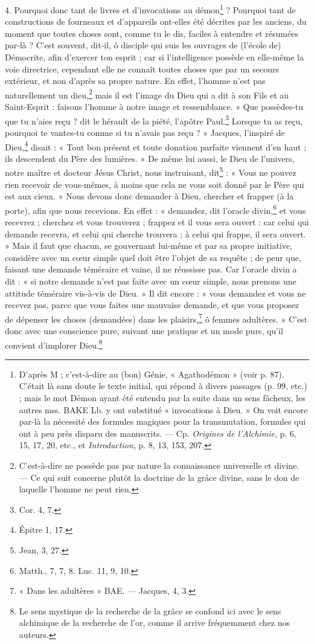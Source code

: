 \documentclass[a4paper, 11pt, oneside, polutonikogreek, french]{article}
\begin{document}
4. Pourquoi donc tant de livres et d'invocations au démon\footnote{D'après M ; c'est-à-dire au (bon) Génie, « Agathodémon » (voir p. 87). C'était là sans doute le texte initial, qui répond à divers passages (p. 99, etc.) ; mais le mot Démon ayant été entendu par la suite dans un sens fâcheux, les autres mss. BAKE Lb. y ont substitué « invocations à Dieu. » On voit encore par-là la nécessité des formules magiques pour la transmutation, formules qui ont à peu près disparu des manuscrits. --- Cp. \emph{Origines de l'Alchimie}, p. 6, 15, 17, 20, etc., et \emph{Introduction}, p. 8, 13, 153, 207.} ? Pourquoi tant de constructions de fourneaux et d'appareils ont-elles été décrites par les anciens, du moment que toutes choses sont, comme tu le dis, faciles à entendre et résumées par-là ? C'est souvent, dit-il, ô disciple qui suis les ouvrages de (l'école de) Démocrite, afin d'exercer ton esprit ; car si l'intelligence possède en elle-même la voie directrice, cependant elle ne connaît toutes choses que par un secours extérieur, et non d'après sa propre nature. En effet, l'homme n'est pas naturellement un dieu,\footnote{C'est-à-dire ne possède pas par nature la connaissance universelle et divine. --- Ce qui suit concerne plutôt la doctrine de la grâce divine, sans le don de laquelle l'homme ne peut rien.} mais il est l'image du Dieu qui a dit à son Fils et au Saint-Esprit : faisons l'homme à notre image et ressemblance. « Que possèdes-tu que tu n'aies reçu ? dit le hérault de la piété, l'apôtre Paul.\footnote{Cor. 4, 7.} Lorsque tu as reçu, pourquoi te vantes-tu comme si tu n'avais pas reçu ? » Jacques, l'inspiré de Dieu,\footnote{Épitre 1, 17.} disait : « Tout bon présent et toute donation parfaite viennent d'en haut ; ils descendent du Père des lumières. » De même lui aussi, le Dieu de l'univers, notre maître et docteur Jésus Christ, nous instruisant, dit\footnote{Jean, 3, 27.} : « Vous ne pouvez rien recevoir de vous-mêmes, à moins que cela ne vous soit donné par le Père qui est aux cieux. » Nous devons donc demander à Dieu, chercher et frapper (à la porte), afin que nous recevions. En effet : « demandez, dit l'oracle divin,\footnote{Matth., 7, 7, 8. Luc. 11, 9, 10.} et vous recevrez ; cherchez et vous trouverez ; frappez et il vous sera ouvert : car celui qui demande recevra, et celui qui cherche trouvera ; à celui qui frappe, il sera ouvert. » Mais il faut que chacun, se gouvernant lui-même et par sa propre initiative, considère avec un cœur simple quel doit être l'objet de sa requête ; de peur que, faisant une demande téméraire et vaine, il ne réussisse pas. Car l'oracle divin a dit : « si notre demande n'est pas faite avec un cœur simple, nous prenons une attitude téméraire vis-à-vis de Dieu. » Il dit encore : « vous demandez et vous ne recevez pas, parce que vous faites une mauvaise demande, et que vous proposez de dépenser les choses (demandées) dans les plaisirs,\footnote{« Dans les adultères » BAE. --- Jacques, 4, 3.} ô femmes adultères. » C'est donc avec une conscience pure, suivant une pratique et un mode purs, qu'il convient d'implorer Dieu.\footnote{Le sens mystique de la recherche de la grâce se confond ici avec le sens alchimique de la recherche de l'or, comme il arrive fréquemment chez nos auteurs.}
\end{document}
